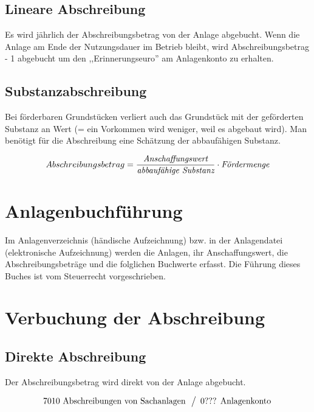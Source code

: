 \documentclass[a4paper,9pt]{article}
\begin{document}
\subsection{Lineare Abschreibung}
Es wird jährlich der Abschreibungsbetrag von der Anlage
abgebucht. Wenn die Anlage am Ende der Nutzungsdauer im Betrieb
bleibt, wird Abschreibungsbetrag - 1 abgebucht um den
,,Erinnerungseuro'' am Anlagenkonto zu erhalten.

\subsection{Substanzabschreibung}
Bei förderbaren Grundstücken verliert auch das Grundstück mit der
geförderten Substanz an Wert (= ein Vorkommen wird weniger, weil es
abgebaut wird). Man benötigt für die Abschreibung eine Schätzung der
abbaufähigen Substanz.

\begin{equation}
  Abschreibungsbetrag = { \textit{Anschaffungswert} \over
\textit{abbaufähige Substanz} } \cdot \textit{Fördermenge}
\end{equation}

\section{Anlagenbuchführung}
Im Anlagenverzeichnis (händische Aufzeichnung) bzw. in der
Anlagendatei (elektronische Aufzeichnung) werden die Anlagen, ihr
Anschaffungswert, die Abschreibungsbeträge und die folglichen
Buchwerte erfasst. Die Führung dieses Buches ist vom Steuerrecht
vorgeschrieben.

\section{Verbuchung der Abschreibung}
\subsection{Direkte Abschreibung}
Der Abschreibungsbetrag wird direkt von der Anlage abgebucht.

\begin{equation*}
  \begin{array}{l}
    \text{7010 Abschreibungen von Sachanlagen}\\
  \end{array}
  \left\slash
    \begin{array}{l}
      \text{0??? Anlagenkonto}\\
    \end{array}
  \right.
\end{equation*}
\end{document}
